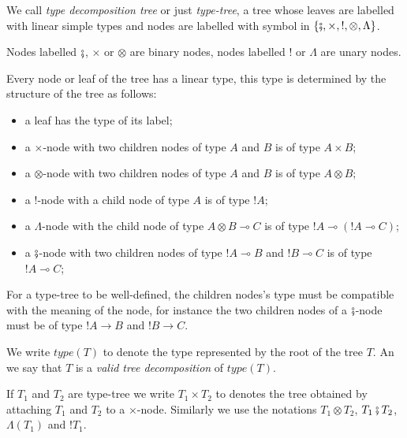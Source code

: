 \begin{dfn}
We call \emph{type decomposition tree} or just \emph{type-tree}, a tree whose leaves are labelled with linear simple types
and nodes are labelled with symbol in
$\{ \fatsemi, \times, !, \otimes, \Lambda \} $.

Nodes labelled $\fatsemi$, $\times$ or $\otimes$ are binary nodes, nodes labelled $!$ or $\Lambda$ are unary nodes.


Every node or leaf of the tree has a linear type, this type is determined by the
structure of the tree as follows:
\begin{itemize}
\item a leaf has the type of its label;

\item a $\times$-node with two children nodes of type $A$
and $B$ is of type $A \times B$;

\item a $\otimes$-node with two children nodes of type $A$
and $B$ is of type $A\otimes B$;

\item a $!$-node with a child node of type $A$ is of type $!A$;

\item a $\Lambda$-node with the child node of type $A \otimes B \multimap C$ is of type $!A \multimap (!A \multimap C)$;

\item a $\fatsemi$-node with two children nodes of type $!A\multimap B$
and $!B \multimap C$ is of type $!A \multimap C$;

\end{itemize}

For a type-tree to be well-defined, the children nodes's type must be compatible with the meaning of the node, for instance
the two children nodes of a $\fatsemi$-node must be of type $!A\rightarrow B$ and $!B\rightarrow C$.

We write $type(T)$ to denote the type represented by the root of the tree $T$. An we say that $T$ is a \emph{valid
tree decomposition} of $type(T)$.

If $T_1$ and $T_2$ are type-tree we write $T_1 \times T_2$ to denotes the tree obtained by attaching $T_1$ and $T_2$ to a $\times$-node.
Similarly we use the notations $T_1 \otimes T_2$, $T_1 \fatsemi T_2$, $\Lambda(T_1)$ and $!T_1$.
\end{dfn}


